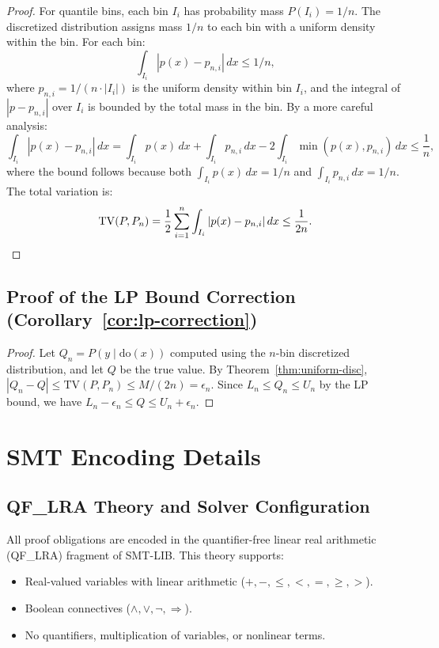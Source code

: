 \documentclass[11pt,a4paper]{article}
\newcommand{\doOp}{\mathrm{do}}
\newcommand{\TV}{\mathrm{TV}}
\begin{document}
\begin{proof}
For quantile bins, each bin $I_i$ has probability mass $P(I_i) = 1/n$. The discretized distribution assigns mass $1/n$ to each bin with a uniform density within the bin. For each bin:
\begin{equation}
\int_{I_i} |p(x) - p_{n,i}| \, dx \leq 1/n,
\end{equation}
where $p_{n,i} = 1/(n \cdot |I_i|)$ is the uniform density within bin $I_i$, and the integral of $|p - p_{n,i}|$ over $I_i$ is bounded by the total mass in the bin. By a more careful analysis:
\begin{equation}
\int_{I_i} |p(x) - p_{n,i}| \, dx = \int_{I_i} p(x) \, dx + \int_{I_i} p_{n,i} \, dx - 2\int_{I_i} \min(p(x), p_{n,i}) \, dx \leq \frac{1}{n},
\end{equation}
where the bound follows because both $\int_{I_i} p(x)\,dx = 1/n$ and $\int_{I_i} p_{n,i}\,dx = 1/n$. The total variation is:
\begin{equation}
\TV(P, P_n) = \frac{1}{2}\sum_{i=1}^n \int_{I_i} |p(x) - p_{n,i}| \, dx \leq \frac{1}{2n}. \qedhere
\end{equation}
\end{proof}

\subsection{Proof of the LP Bound Correction (Corollary~\ref{cor:lp-correction})}

\begin{proof}
Let $Q_n = P(y \mid \doOp(x))$ computed using the $n$-bin discretized distribution, and let $Q$ be the true value. By Theorem~\ref{thm:uniform-disc}, $|Q_n - Q| \leq \TV(P, P_n) \leq M/(2n) = \epsilon_n$. Since $L_n \leq Q_n \leq U_n$ by the LP bound, we have $L_n - \epsilon_n \leq Q \leq U_n + \epsilon_n$.
\end{proof}

\section{SMT Encoding Details}
\label{app:smt}

\subsection{QF\_LRA Theory and Solver Configuration}

All proof obligations are encoded in the quantifier-free linear real arithmetic (QF\_LRA) fragment of SMT-LIB. This theory supports:
\begin{itemize}[nosep]
\item Real-valued variables with linear arithmetic ($+, -, \leq, <, =, \geq, >$).
\item Boolean connectives ($\land, \lor, \neg, \Rightarrow$).
\item No quantifiers, multiplication of variables, or nonlinear terms.
\end{itemize}
\end{document}

